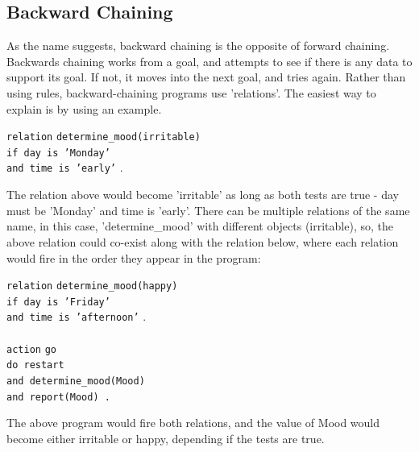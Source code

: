 \documentclass[12pt]{report}
\begin{document}
\subsection{Backward Chaining}\label{subsec:backward_chaining}
As the name suggests, backward chaining is the opposite of forward chaining.  Backwards chaining works from a goal, and attempts to see if there is any data to support its goal.  If not, it moves into the next goal, and tries again.  Rather than using rules, backward-chaining programs use 'relations'.  The easiest way to explain is by using an example.\\
\begin{tabbing}
	\texttt{relation} \= \texttt{determine\_mood(irritable)}\\
	\> \texttt{if day is 'Monday'}\\
	\> \texttt{and time is 'early'} .\\
\end{tabbing}
The relation above would become 'irritable' as long as both tests are true - day must be 'Monday' and time is 'early'.  There can be multiple relations of the same name, in this case, 'determine\_mood' with different objects (irritable), so, the above relation could co-exist along with the relation below, where each relation would fire in the order they appear in the program:
\begin{tabbing}
	\texttt{relation} \= \texttt{determine\_mood(happy)}\\
	\> \texttt{if day is 'Friday'}\\
	\> \texttt{and time is 'afternoon'} .\\
	\\
	\texttt{action} \= \texttt{go}\\
	\> \texttt{do restart}\\
	\> \texttt{and determine\_mood(Mood)}\\
	\> \texttt{and report(Mood) .}\\
\end{tabbing}
The above program would fire both relations, and the value of Mood would become either irritable or happy, depending if the tests are true.
\clearpage
\end{document}
